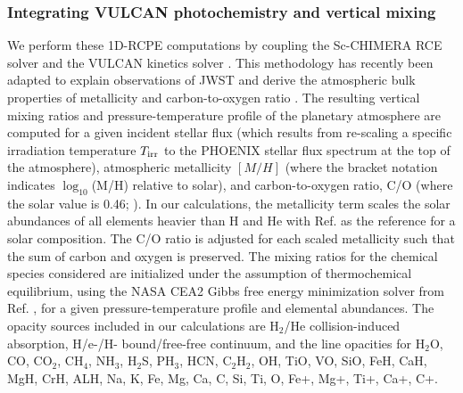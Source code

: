 \documentclass[sn-standardnature]{sn-jnl}%
\begin{document}
\subsubsection*{Integrating VULCAN photochemistry and vertical mixing}

We perform these 1D-RCPE computations by coupling the Sc-CHIMERA RCE solver  and the VULCAN kinetics solver . This methodology has recently been adapted to explain observations of JWST and derive the atmospheric bulk properties of metallicity and carbon-to-oxygen ratio . The resulting vertical mixing ratios and pressure-temperature profile of the planetary atmosphere are computed for a given incident stellar flux (which results from re-scaling a specific irradiation temperature $T_{\rm irr}$ to the PHOENIX  stellar flux spectrum at the top of the atmosphere), atmospheric metallicity $[M/H]$ (where the bracket notation indicates $\log_{10}$(M/H) relative to solar), and carbon-to-oxygen ratio, C/O (where the solar value is 0.46; ). In our calculations, the metallicity term scales the solar abundances of all elements heavier than H and He with Ref.  as the reference for a solar composition. The C/O ratio is adjusted for each scaled metallicity such that the sum of carbon and oxygen is preserved. The mixing ratios for the chemical species considered are initialized under the assumption of thermochemical equilibrium, using the NASA CEA2 Gibbs free energy minimization solver from Ref. , for a given pressure-temperature profile and elemental abundances. The opacity sources included in our calculations are H$_2$/He collision-induced absorption, H/e-/H- bound/free-free continuum, and the line opacities for H$_2$O, CO, CO$_2$, CH$_4$, NH$_3$, H$_2$S, PH$_3$, HCN, C$_2$H$_2$, OH, TiO, VO, SiO, FeH, CaH, MgH, CrH, ALH, Na, K, Fe, Mg, Ca, C, Si, Ti, O, Fe+, Mg+, Ti+, Ca+, C+.
\end{document}

